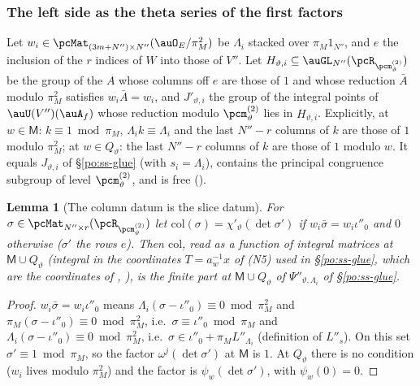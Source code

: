 \documentclass[10pt]{amsart}
\newtheorem{lemma}[theorem]{Lemma}
\theoremstyle{definition}
\theoremstyle{remark}
\begin{document}
\subsubsection{The left side as the theta series of the first factors}\label{pte:ss-left}

Let $w_i\in\pcMat_{(3m+N'')\times N''}(\auO_E/\pi_M^2)$ be $\Lambda_i$ stacked over $\pi_M1_{N''}$, and $e$ the
inclusion of the $r$ indices of $W$ into those of $V''$. Let $H_{\vartheta,i}\subseteq\auGL_{N''}(\pcR_{\pcm^{(2)}_\vartheta})$ be
the group of the $A$ whose columns off $e$ are those of $1$ and whose reduction $\bar A$ modulo $\pi_M^2$
satisfies $w_i\bar A=w_i$, and $J'_{\vartheta,i}$ the group of the integral points of $\auU(V'')(\auA_f)$ whose reduction modulo
$\pcm^{(2)}_\vartheta$ lies in $H_{\vartheta,i}$. Explicitly, at $w\in\mathsf M$: $k\equiv1\bmod\pi_M$, $\Lambda_ik\equiv\Lambda_i$ and the
last $N''-r$ columns of $k$ are those of $1$ modulo $\pi_M^2$; at $w\in Q_\vartheta$: the last $N''-r$ columns of
$k$ are those of $1$ modulo $w$. It equals $J_{\vartheta,i}$ of \S\ref{po:ss-glue} (with $s_i=\Lambda_i$),
contains the principal congruence subgroup of level $\pcm^{(2)}_\vartheta$, and is free ({\cite[Lemma~14.5]{P46}}).

\begin{lemma}[The column datum is the slice datum]\label{pte:column}
For $\sigma\in\pcMat_{N''\times r}(\pcR_{\pcm^{(2)}_\vartheta})$ let $\mathrm{col}(\sigma)=\chi'_\vartheta(\det\sigma')$ if $w_i\bar\sigma=
w_i\iota''_0$ and $0$ otherwise ($\sigma'$ the rows $e$). Then $\mathrm{col}$, read as a function of integral
matrices at $\mathsf M\cup Q_\vartheta$ (integral in the coordinates $T=a_w^{-1}x$ of (N5) used in
\S\ref{po:ss-glue}, which are the coordinates of {\cite[Definition~6.31]{P53}}, {\cite[Lemma~6.32(c)]{P53}}), is the finite part at $\mathsf M\cup Q_\vartheta$ of $\Psi''_{\vartheta,\Lambda_i}$ of
\S\ref{po:ss-glue}.
\end{lemma}
\begin{proof}
$w_i\bar\sigma=w_i\iota''_0$ means $\Lambda_i(\sigma-\iota''_0)\equiv0\bmod\pi_M^2$ and $\pi_M(\sigma-\iota''_0)\equiv0\bmod\pi_M^2$,
i.e.\ $\sigma\equiv\iota''_0\bmod\pi_M$ and $\Lambda_i(\sigma-\iota''_0)\equiv0\bmod\pi_M^2$, i.e.\ $\sigma\in\iota''_0+\pi_ML''_{\Lambda_i}$
(definition of $L''_s$). On this set $\sigma'\equiv1\bmod\pi_M$, so the factor $\omega^j(\det\sigma')$ at $\mathsf M$ is
$1$. At $Q_\vartheta$ there is no condition ($w_i$ lives modulo $\pi_M^2$) and the factor is $\psi_w(\det\sigma')$, with
$\psi_w(0)=0$.
\end{proof}
\end{document}
